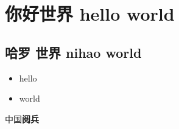 \documentclass[zh]{noteclass}
\begin{document}
\section{你好世界 hello world}
\subsection{哈罗 世界 nihao world}
\begin{itemize}
    \item hello
    \item world
\end{itemize}
中国{\bf 阅兵}
\end{document}
